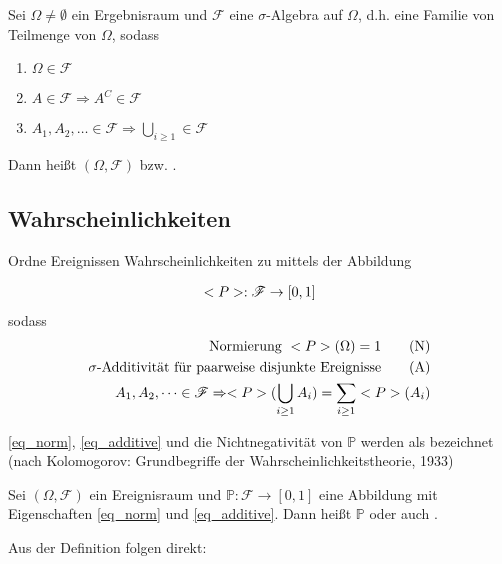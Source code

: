 \begin{definition}
	Sei $\Omega \neq \emptyset$ ein Ergebnisraum und $\mathscr{F}$ eine $\sigma$-Algebra auf $\Omega$, d.h. eine Familie von Teilmenge von $\Omega$, sodass
	\begin{enumerate}
		\item $\Omega \in \mathscr{F}$
		\item $A \in \mathscr{F} \Rightarrow A^C \in \mathscr{F}$
		\item $A_1, A_2, \dots \in \mathscr{F} \Rightarrow \bigcup_{i \ge 1} \in \mathscr{F}$
	\end{enumerate}
	Dann heißt $(\Omega, \mathscr{F})$  bzw. .
\end{definition}

\subsection*{Wahrscheinlichkeiten}

Ordne Ereignissen Wahrscheinlichkeiten zu mittels der Abbildung

\begin{align}
	\mathbb{P}: \mathscr{F} \to [0,1]\notag
\end{align}
sodass
\begin{align}
	\text{Normierung } \mathbb{P}(\Omega) = 1 \tag{N}\label{eq_norm}\\
	\sigma\text{-Additivität für paarweise disjunkte Ereignisse} \tag{A}\label{eq_additive}\\
	A_1, A_2, \dots \in \mathscr{F} \Rightarrow \mathbb{P}(\bigcup_{i \ge 1} A_i) = \sum_{i \ge 1} \mathbb{P}(A_i)\notag
\end{align}

\cref{eq_norm}, \cref{eq_additive} und die Nichtnegativität von $\mathbb{P}$ werden als  bezeichnet (nach Kolomogorov: Grundbegriffe der Wahrscheinlichkeitstheorie, 1933)

\begin{definition}
	Sei $(\Omega, \mathscr{F})$ ein Ereignisraum und $\mathbb{P}: \mathscr{F} \to [0,1]$ eine Abbildung mit Eigenschaften \cref{eq_norm} und \cref{eq_additive}. Dann heißt $\mathbb{P}$  oder auch .
\end{definition}

Aus der Definition folgen direkt:

